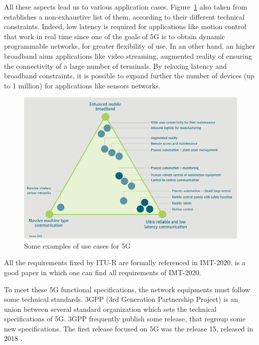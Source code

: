 \documentclass[a4paper,10pt]{article}
\begin{document}
All these aspects lead us to various application cases. Figure~\ref{fig:usecases} also taken from~\cite{5GACIA} establishes a non-exhaustive list of them, according to their different technical constraints. Indeed, low latency is required for applications like motion control that work in real time since one of the goals of 5G is to obtain dynamic programmable networks, for greater flexibility of use.
 In an other hand, an higher broadband aims applications like video streaming, augmented reality of ensuring the connectivity of a large number of terminals.
By relaxing latency and broadband constraints, it is possible to expand further the number of devices (up to 1 million) for applications like sensors networks.

  \begin{figure}[h] 
      \begin{center}
      \includegraphics[width=1\textwidth]{usecases.png}
      \end{center}
      \caption{Some examples of use cases for 5G}\label{fig:usecases}
      \end{figure}
          


 All the requirements fixed by ITU-R are formally referenced in IMT-2020. \cite{dahlman20185g} is a good paper in which one can find all requirements of IMT-2020.
 

To meet these 5G functional specifications, the network equipments must follow some technical standards. 3GPP (3rd Generation Partnership Project) is an union between several standard organization which sets the technical specifications of 5G. 3GPP frequently publish some release, that regroup some new specifications. The first release focused on 5G was the release 15, released in 2018 \cite{RELEASENOKIA}.  
\end{document}
